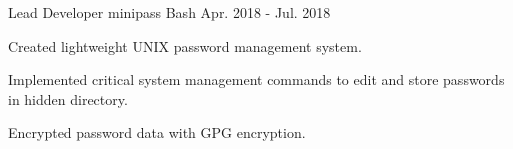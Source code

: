 \begin{cventries}
  \cventry
    {Lead Developer}
    {minipass}
    {Bash}
    {Apr. 2018 - Jul. 2018}
    {
      \begin{cvitems}
        \item {Created lightweight UNIX password management system.}
        \item {Implemented critical system management commands to edit and store passwords in hidden directory.}
        \item {Encrypted password data with GPG encryption.}
      \end{cvitems}
    }
\end{cventries}